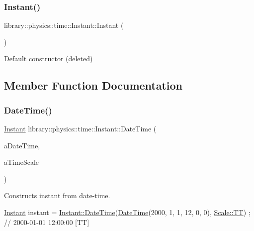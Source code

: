 \subsubsection{\texorpdfstring{Instant()}{Instant()}}
{\footnotesize\ttfamily library\+::physics\+::time\+::\+Instant\+::\+Instant (\begin{DoxyParamCaption}{ }\end{DoxyParamCaption})\hspace{0.3cm}{\ttfamily [delete]}}



Default constructor (deleted) 



\subsection{Member Function Documentation}
\mbox{\label{classlibrary_1_1physics_1_1time_1_1_instant_ac827b6ffa57ce75a3c56c462d4c872f8}} 
\subsubsection{\texorpdfstring{Date\+Time()}{DateTime()}}
{\footnotesize\ttfamily \hyperlink{classlibrary_1_1physics_1_1time_1_1_instant}{Instant} library\+::physics\+::time\+::\+Instant\+::\+Date\+Time (\begin{DoxyParamCaption}\item[{const \hyperlink{classlibrary_1_1physics_1_1time_1_1_date_time}{time\+::\+Date\+Time} \&}]{a\+Date\+Time,  }\item[{const \hyperlink{namespacelibrary_1_1physics_1_1time_a09d2bc9fbc7b0b5f92e1419bd655e6bb}{Scale} \&}]{a\+Time\+Scale }\end{DoxyParamCaption})\hspace{0.3cm}{\ttfamily [static]}}



Constructs instant from date-\/time. 


\begin{DoxyCode}
\hyperlink{classlibrary_1_1physics_1_1time_1_1_instant_a7916a9d8acb9de4eda35f9d72086a618}{Instant} instant = \hyperlink{classlibrary_1_1physics_1_1time_1_1_instant_ac827b6ffa57ce75a3c56c462d4c872f8}{Instant::DateTime}(\hyperlink{classlibrary_1_1physics_1_1time_1_1_instant_ac827b6ffa57ce75a3c56c462d4c872f8}{DateTime}(2000, 1, 1, 12, 0, 0), 
      \hyperlink{namespacelibrary_1_1physics_1_1time_a09d2bc9fbc7b0b5f92e1419bd655e6bbadf1f3edb9115acb0a1e04209b7a9937b}{Scale::TT}) ; \textcolor{comment}{// 2000-01-01 12:00:00 [TT]}
\end{DoxyCode}


